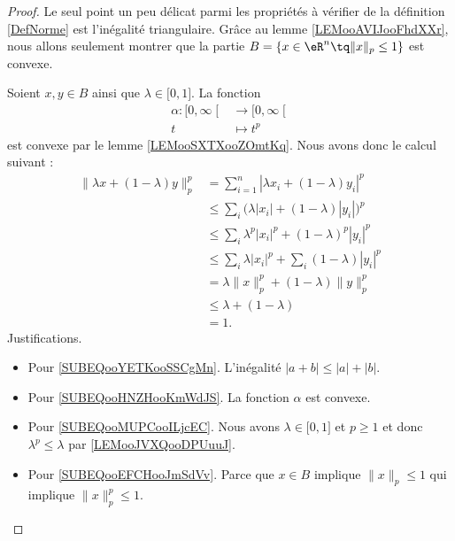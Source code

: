 \begin{proof}
    Le seul point un peu délicat parmi les propriétés à vérifier de la définition \ref{DefNorme} est l'inégalité triangulaire. Grâce au lemme \ref{LEMooAVIJooFhdXXr}, nous allons seulement montrer que la partie \( B=\{ x\in \eR^n\tq \| x \|_p\leq 1 \}\) est convexe.

    Soient \( x,y\in B\) ainsi que \( \lambda\in \mathopen[ 0 , 1 \mathclose]\). La fonction
    \begin{equation}
        \begin{aligned}
            \alpha\colon \mathopen[ 0 , \infty \mathclose[  & \to \mathopen[ 0 , \infty \mathclose[ \\
                                      t                     & \mapsto t^p
        \end{aligned}
    \end{equation}
    est convexe par le lemme \ref{LEMooSXTXooZOmtKq}. Nous avons donc le calcul suivant :
    \begin{subequations}
        \begin{align}
            \| \lambda x+(1-\lambda)y \|_p^p  & =\sum_{i=1}^n| \lambda x_i+(1-\lambda)y_i |^p                 \\
                & \leq  \sum_i\big( \lambda| x_i |+(1-\lambda)| y_i | \big)^p   \label{SUBEQooYETKooSSCgMn}   \\
                & \leq  \sum_i\lambda^p| x_i |^p+(1-\lambda)^p| y_i |^p         \label{SUBEQooHNZHooKmWdJS}   \\
                & \leq  \sum_i \lambda| x_i |^p+\sum_i(1-\lambda)| y_i |^p      \label{SUBEQooMUPCooILjcEC}   \\
                &   =   \lambda\| x \|_p^p+(1-\lambda)\| y \|_p^p\\
                & \leq  \lambda+(1-\lambda)       \label{SUBEQooEFCHooJmSdVv}\\
                &   =   1.
        \end{align}
    \end{subequations}
    Justifications.
    \begin{itemize}
        \item Pour \eqref{SUBEQooYETKooSSCgMn}. L'inégalité \( | a+b |\leq | a |+| b |\).
        \item Pour \eqref{SUBEQooHNZHooKmWdJS}. La fonction \( \alpha\) est convexe.
        \item Pour \eqref{SUBEQooMUPCooILjcEC}. Nous avons \( \lambda\in\mathopen[ 0 , 1 \mathclose]\) et \( p\geq 1\) et donc \( \lambda^p\leq \lambda\) par \ref{LEMooJVXQooDPUuuJ}.
        \item Pour \eqref{SUBEQooEFCHooJmSdVv}. Parce que \( x\in B\) implique \( \| x \|_p\leq 1\) qui implique  \( \| x \|_p^p\leq 1\).
    \end{itemize}
\end{proof}

